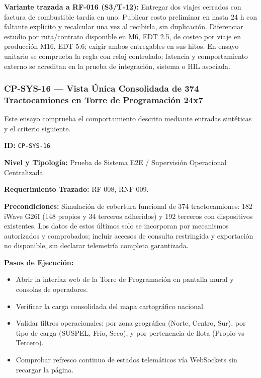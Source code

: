 \par\noindent\textbf{Variante trazada a RF-016 (S3/T-12):} Entregar dos viajes cerrados con factura de combustible tardía en uno. Publicar costo preliminar en hasta 24 h con faltante explícito y recalcular una vez al recibirla, sin duplicación. Diferenciar estudio por ruta/contrato disponible en M6, EDT 2.5, de costeo por viaje en producción M16, EDT 5.6; exigir ambos entregables en sus hitos. En ensayo unitario se comprueba la regla con reloj controlado; latencia y comportamiento externo se acreditan en la prueba de integración, sistema o HIL asociada.\par
\subsubsection*{CP-SYS-16 — Vista Única Consolidada de 374 Tractocamiones en Torre de Programación 24x7}\label{sec:9-cp-sys-16}

Este ensayo comprueba el comportamiento descrito mediante entradas sintéticas y el criterio siguiente.

\par\noindent\textbf{ID:} \texttt{CP-\allowbreak{}SYS-\allowbreak{}16}\par
\par\noindent\textbf{Nivel y Tipología:} Prueba de Sistema E2E / Supervisión Operacional Centralizada.\par
\par\noindent\textbf{Requerimiento Trazado:} RF-008, RNF-009.\par
\par\noindent\textbf{Precondiciones:} Simulación de cobertura funcional de 374 tractocamiones: 182 iWave G26I (148 propios y 34 terceros adheridos) y 192 terceros con dispositivos existentes. Los datos de estos últimos solo se incorporan por mecanismos autorizados y comprobados; incluir accesos de consulta restringida y exportación no disponible, sin declarar telemetría completa garantizada.\par
\par\noindent\textbf{Pasos de Ejecución:}\par
\begin{itemize}
\item Abrir la interfaz web de la Torre de Programación en pantalla mural y consolas de operadores.
\item Verificar la carga consolidada del mapa cartográfico nacional.
\item Validar filtros operacionales: por zona geográfica (Norte, Centro, Sur), por tipo de carga (SUSPEL, Frío, Seco), y por pertenencia de flota (Propio vs Tercero).
\item Comprobar refresco continuo de estados telemáticos vía WebSockets sin recargar la página.
\end{itemize}

